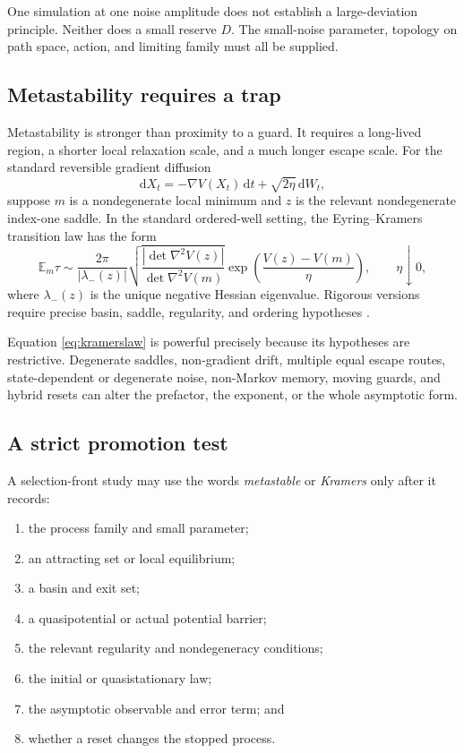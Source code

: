 \documentclass[11pt]{article}
\theoremstyle{definition}
\theoremstyle{remark}
\newcommand{\EE}{\mathbb E}
\newcommand{\dd}{\mathrm d}
\begin{document}
One simulation at one noise amplitude does not establish a
large-deviation principle.  Neither does a small reserve \(D\).  The
small-noise parameter, topology on path space, action, and limiting family
must all be supplied.

\subsection{Metastability requires a trap}

Metastability is stronger than proximity to a guard.  It requires a
long-lived region, a shorter local relaxation scale, and a much longer
escape scale.  For the standard reversible gradient diffusion
\begin{equation}
 \dd X_t
 =
 -\nabla V(X_t)\,\dd t
 +
 \sqrt{2\eta}\,\dd W_t,
\label{eq:kramers}
\end{equation}
suppose \(m\) is a nondegenerate local minimum and \(z\) is the relevant
nondegenerate index-one saddle.  In the standard ordered-well setting,
the Eyring--Kramers transition law has the form
\begin{equation}
 \EE_m\tau
 \sim
 \frac{2\pi}{|\lambda_-(z)|}
 \sqrt{
 \frac{|\det\nabla^2V(z)|}
      {\det\nabla^2V(m)}
 }
 \exp\!\left(\frac{V(z)-V(m)}{\eta}\right),
 \qquad \eta\downarrow0,
\label{eq:kramerslaw}
\end{equation}
where \(\lambda_-(z)\) is the unique negative Hessian eigenvalue.  Rigorous
versions require precise basin, saddle, regularity, and ordering
hypotheses
\cite{BovierEtAl2004,Berglund2013}.

Equation \eqref{eq:kramerslaw} is powerful precisely because its
hypotheses are restrictive.  Degenerate saddles, non-gradient drift,
multiple equal escape routes, state-dependent or degenerate noise,
non-Markov memory, moving guards, and hybrid resets can alter the prefactor,
the exponent, or the whole asymptotic form.

\subsection{A strict promotion test}

A selection-front study may use the words \emph{metastable} or
\emph{Kramers} only after it records:
\begin{enumerate}[leftmargin=2em]
\item the process family and small parameter;
\item an attracting set or local equilibrium;
\item a basin and exit set;
\item a quasipotential or actual potential barrier;
\item the relevant regularity and nondegeneracy conditions;
\item the initial or quasistationary law;
\item the asymptotic observable and error term; and
\item whether a reset changes the stopped process.
\end{enumerate}
\end{document}
